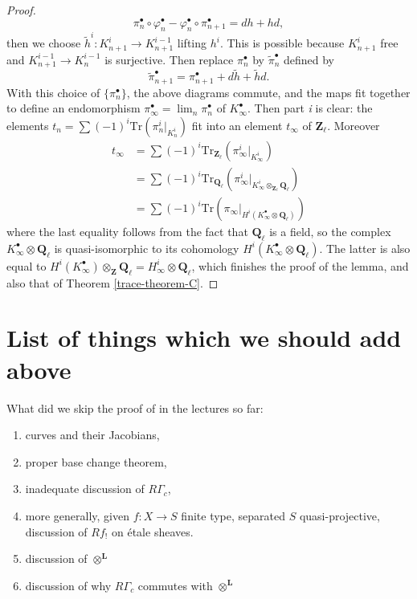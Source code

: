 \begin{proof}
$$
\pi_n^\bullet \circ \varphi_n^\bullet -
\varphi_n^\bullet \circ \pi_{n + 1}^\bullet = dh + hd,
$$
then we choose $\tilde h^i : K_{n+1}^i\to K_{n+1}^{i-1}$ lifting $h^i$. This is
possible because $K_{n+1}^i$ free and $K_{n+1}^{i-1}\to K_n^{i-1}$ is
surjective. Then replace $\pi_n^\bullet$ by $\tilde\pi_n^\bullet$ defined by
$$
\tilde\pi_{n+1}^\bullet = \pi_{n+1}^\bullet + d\tilde h+\tilde hd.
$$
With this choice of $\{\pi_n^\bullet\}$, the above diagrams commute, and the
maps fit together to define an endomorphism $\pi_\infty^\bullet =
\lim_n\pi_n^\bullet$ of $K_\infty^\bullet$. Then part {\it i} is clear:
the elements $t_n = \sum(-1)^i \text{Tr}\left(\pi_n^i |_{K_n^i}\right)$
fit into an element $t_\infty$ of $\mathbf{Z}_\ell$. Moreover
\begin{align*}
t_\infty
& =
\sum (-1)^i \text{Tr}_{\mathbf{Z}_\ell}(\pi_\infty^i |_{K_\infty^i}) \\
& =
\sum (-1)^i \text{Tr}_{\mathbf{Q}_\ell}(
\pi_\infty^i |_{K_\infty^i \otimes_{\mathbf{Z}_\ell}\mathbf{Q}_\ell}) \\
& =
\sum (-1)^i \text{Tr}(
\pi_\infty |_{H^i(K_\infty^\bullet \otimes \mathbf{Q}_\ell)})
\end{align*}
where the last equality follows from the fact that $\mathbf{Q}_\ell$ is a
field, so the complex $K_\infty^\bullet \otimes \mathbf{Q}_\ell$ is
quasi-isomorphic to its cohomology
$H^i(K_\infty^\bullet \otimes \mathbf{Q}_\ell)$. The latter is also equal to
$H^i(K_\infty^\bullet)\otimes_{\mathbf{Z}}\mathbf{Q}_\ell = H_\infty^i \otimes
\mathbf{Q}_\ell$, which finishes the proof of the lemma, and also that of
Theorem \ref{trace-theorem-C}.
\end{proof}

\section{List of things which we should add above}
\label{trace-section-list-skipped}
What did we skip the proof of in the lectures so far:
\begin{enumerate}
\item curves and their Jacobians,
\item proper base change theorem,
\item inadequate discussion of $R\Gamma_c$,
\item more generally, given $f : X \to S$ finite type,
separated $S$ quasi-projective, discussion of $Rf_!$ on \'etale sheaves.
\item discussion of $\otimes^{\mathbf{L}}$
\item discussion of why $R\Gamma_c$ commutes with $\otimes^{\mathbf{L}}$
\end{enumerate}


